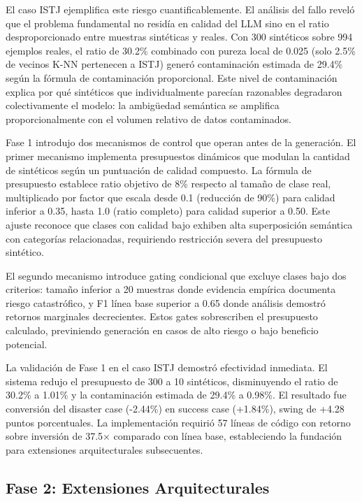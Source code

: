 El caso ISTJ ejemplifica este riesgo cuantificablemente. El análisis del fallo reveló que el problema fundamental no residía en calidad del LLM sino en el ratio desproporcionado entre muestras sintéticas y reales. Con 300 sintéticos sobre 994 ejemplos reales, el ratio de 30.2\% combinado con pureza local de 0.025 (solo 2.5\% de vecinos K-NN pertenecen a ISTJ) generó contaminación estimada de 29.4\% según la fórmula de contaminación proporcional. Este nivel de contaminación explica por qué sintéticos que individualmente parecían razonables degradaron colectivamente el modelo: la ambigüedad semántica se amplifica proporcionalmente con el volumen relativo de datos contaminados.

Fase 1 introdujo dos mecanismos de control que operan antes de la generación. El primer mecanismo implementa presupuestos dinámicos que modulan la cantidad de sintéticos según un puntuación de calidad compuesto. La fórmula de presupuesto establece ratio objetivo de 8\% respecto al tamaño de clase real, multiplicado por factor que escala desde 0.1 (reducción de 90\%) para calidad inferior a 0.35, hasta 1.0 (ratio completo) para calidad superior a 0.50. Este ajuste reconoce que clases con calidad bajo exhiben alta superposición semántica con categorías relacionadas, requiriendo restricción severa del presupuesto sintético.

El segundo mecanismo introduce gating condicional que excluye clases bajo dos criterios: tamaño inferior a 20 muestras donde evidencia empírica documenta riesgo catastrófico, y F1 línea base superior a 0.65 donde análisis demostró retornos marginales decrecientes. Estos gates sobrescriben el presupuesto calculado, previniendo generación en casos de alto riesgo o bajo beneficio potencial.

La validación de Fase 1 en el caso ISTJ demostró efectividad inmediata. El sistema redujo el presupuesto de 300 a 10 sintéticos, disminuyendo el ratio de 30.2\% a 1.01\% y la contaminación estimada de 29.4\% a 0.98\%. El resultado fue conversión del disaster case (-2.44\%) en success case (+1.84\%), swing de +4.28 puntos porcentuales. La implementación requirió 57 líneas de código con retorno sobre inversión de 37.5× comparado con línea base, estableciendo la fundación para extensiones arquitecturales subsecuentes.

\subsection{Fase 2: Extensiones Arquitecturales}
\label{subsec:fase2}

